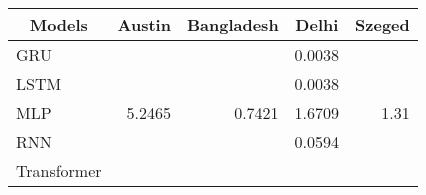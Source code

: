 \label{sec:ExpRes}

\begin{table}[]
\begin{tabular}{|l|r|r|r|r|}
\hline
\multicolumn{1}{|c|}{Models} & \multicolumn{1}{c|}{Austin} & \multicolumn{1}{c|}{Bangladesh} & \multicolumn{1}{c|}{Delhi} & \multicolumn{1}{c|}{Szeged} \\ \hline
GRU                          &                             &                                 & 0.0038                     &                             \\ \hline
LSTM                         &                             &                                 & 0.0038                     &                             \\ \hline
MLP                          & 5.2465                      & 0.7421                          & 1.6709                     & 1.31                        \\ \hline
RNN                          &                             &                                 & 0.0594                     &                             \\ \hline
Transformer                  &                             &                                 &                            &                             \\ \hline
\end{tabular}
\end{table}